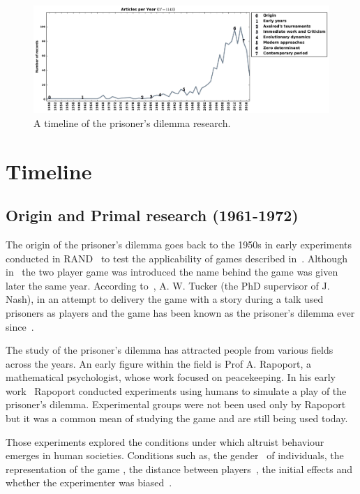 \documentclass{article}
\begin{document}
\begin{figure}[!htbp]
    \centering
    \includegraphics[width=\textwidth]{assets/images/timeline.pdf}
    \caption{\label{fig:timeline} A timeline of the prisoner's dilemma research.}
\end{figure}

\section{Timeline}\label{section:timeline}

\subsection{Origin and Primal research (1961-1972)}

The origin of the prisoner's dilemma goes back to the 1950s in early experiments
conducted in RAND~\cite{Flood1958} to test the applicability of games
described in~\cite{VonNeumann1944}. Although in~\cite{Flood1958} the two player
game was introduced the name behind the game was given later the same year.
According to~\cite{Tucker1983}, A. W. Tucker (the PhD supervisor of J. Nash),
in an attempt to delivery the game with a story during a talk used prisoners as
players and the game has been known as the prisoner's dilemma ever since~\cite{Tucker1983}.

The study of the prisoner's dilemma has attracted people from various fields
across the years. An early figure within the field is Prof A. Rapoport,
a mathematical psychologist, whose work focused on peacekeeping.
In his early work~\cite{rapoport1965} Rapoport conducted experiments using humans
to simulate a play of the prisoner's dilemma. Experimental groups were not been
used only by Rapoport but it was a common mean of studying the game
\cite{Evans1966, Gallo1968, Lutzker1961, Mack1971, Sensenig1972} and are still
being used today. %

Those experiments explored the conditions under which altruist behaviour emerges
in human societies. Conditions such as, the gender~\cite{Evans1966,
Lutzker1961, Mack1971} of individuals, the representation of the game
\cite{Evans1966}, the distance between players~\cite{Sensenig1972}, the initial effects
\cite{Tedeschi1968} and whether the experimenter was biased~\cite{Gallo1968}.
\end{document}
